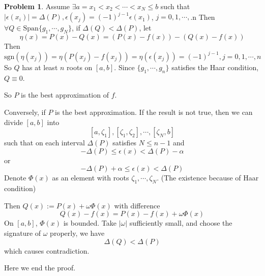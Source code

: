 \documentclass[a4paper]{article}
\theoremstyle{definition}
\newtheorem{problem}{Problem}
\theoremstyle{plain}
\newcommand{\Span}{\mathrm{Span}}
\newcommand{\sgn}{\mathrm{sgn}}
\newcommand{\<}{\left<}
\renewcommand{\>}{\right>}
\numberwithin{equation}{problem}
\begin{document}
\begin{problem}
    Assume  $ \exists a=x_1<x_2<\cdots<x_N \leq b $ such that  $ |\epsilon(x_i)|=\Delta(P),\epsilon(x_j)=(-1)^{j-1}\epsilon (x_1) $,  $ j=0,1,\cdots, $.n Then  $ \forall Q\in \Span\{g_1,\cdots,g_N\} $, if  $ \Delta(Q)<\Delta(P) $, 
    let 
    \[\eta(x)=P(x)-Q(x)=(P(x)-f(x))-(Q(x)-f(x))\]
    Then 
    \[\sgn(\eta(x_j))=\eta(P(x_j)-f(x_j))=\eta(\epsilon(x_j))=(-1)^{j-1},j=0,1,\cdots,n\]
    So  $ Q $  has    at least  $ n $ roots on  $ [a,b] $. Since  $ \{g_1,\cdots,g_n\} $ satisfies the Haar condition,  $ Q\equiv 0 $.
    
    So  $ P $ is the best approximation of  $ f $.
    
    Conversely, if  $ P $  is the best approximation. If the result is not true, then we can divide  $ [a,b] $  into 
    \[[a,\zeta_1],[\zeta_1,\zeta_2],\cdots,[\zeta_{N},b]\]
    such that on each interval  $ \Delta(P) $ satisfies  $ N \leq n-1 $ and  
    \[-\Delta(P) \leq \epsilon(x)<\Delta(P)-\alpha\]
    or 
    \[-\Delta(P)+\alpha \leq \epsilon(x)<\Delta(P)\] 
    Denote  $ \Phi(x) $ as an element with roots  $ \zeta_1,\cdots,\zeta_N $. (The existence because of Haar condition)
    
    Then  $ Q(x):=P(x)+\omega \Phi(x) $ with difference 
    \[Q(x)-f(x)=P(x)-f(x)+\omega\Phi(x)\]
    On  $ [a,b] $,  $ \Phi(x) $ is bounded. Take  $ |\omega| $ sufficiently small, and choose the signature of  $ \omega $     properly, we have 
    \[\Delta(Q)<\Delta(P)\]
    which causes contradiction.

    Here we end the proof.
\end{problem}
\end{document}
